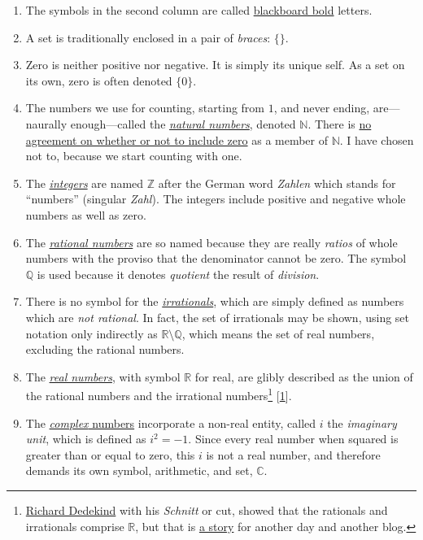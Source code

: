 \documentclass[
  a4paper,
]{article}
\begin{document}
\begin{enumerate}
\item
  The symbols in the second column are called
  \href{https://oeis.org/wiki/Blackboard_bold}{blackboard bold} letters.
\item
  A set is traditionally enclosed in a pair of \emph{braces}: \(\{\}\).
\item
  Zero is neither positive nor negative. It is simply its unique self.
  As a set on its own, zero is often denoted \(\{0\}\).
\item
  The numbers we use for counting, starting from \(1\), and never
  ending, are---naurally enough---called the
  \href{https://mathworld.wolfram.com/NaturalNumber.html}{\emph{natural
  numbers}}, denoted \(\mathbb{N}\). There is
  \href{https://en.wikipedia.org/wiki/Natural_number}{no agreement on
  whether or not to include zero} as a member of \(\mathbb{N}\). I have
  chosen not to, because we start counting with one.
\item
  The \href{https://en.wikipedia.org/wiki/Integer}{\emph{integers}} are
  named \(\mathbb{Z}\) after the German word \emph{Zahlen} which stands
  for ``numbers'' (singular \emph{Zahl}). The integers include positive
  and negative whole numbers as well as zero.
\item
  The
  \href{https://mathworld.wolfram.com/RationalNumber.html}{\emph{rational
  numbers}} are so named because they are really \emph{ratios} of whole
  numbers with the proviso that the denominator cannot be zero. The
  symbol \(\mathbb{Q}\) is used because it denotes \emph{quotient} the
  result of \emph{division}.
\item
  There is no symbol for the
  \href{https://mathworld.wolfram.com/IrrationalNumber.html}{\emph{irrationals}},
  which are simply defined as numbers which are \emph{not rational}. In
  fact, the set of irrationals may be shown, using set notation only
  indirectly as \(\mathbb{R}\setminus\mathbb{Q}\), which means the set
  of real numbers, excluding the rational numbers.
\item
  The \href{https://en.wikipedia.org/wiki/Real_number}{\emph{real
  numbers}}, with symbol \(\mathbb{R}\) for real, are glibly described
  as the union of the rational numbers and the irrational
  numbers\footnote{\href{https://en.wikipedia.org/wiki/Richard_Dedekind}{Richard
    Dedekind} with his \emph{Schnitt} or cut, showed that the rationals
    and irrationals comprise \(\mathbb{R}\), but that is
    \href{https://arpita95b.medium.com/cutting-through-the-confusion-how-dedekind-cuts-build-the-real-numbers-20aeaaec021d}{a
    story} for another day and another blog.}
  {[}\protect\hyperlink{ref-arpita2023}{1}{]}.
\item
  The \href{https://en.wikipedia.org/wiki/Complex_number}{\emph{complex}
  numbers} incorporate a non-real entity, called \(i\) the
  \emph{imaginary unit}, which is defined as \(i^2 = -1\). Since every
  real number when squared is greater than or equal to zero, this \(i\)
  is not a real number, and therefore demands its own symbol,
  arithmetic, and set, \(\mathbb{C}\).
\end{enumerate}
\end{document}
